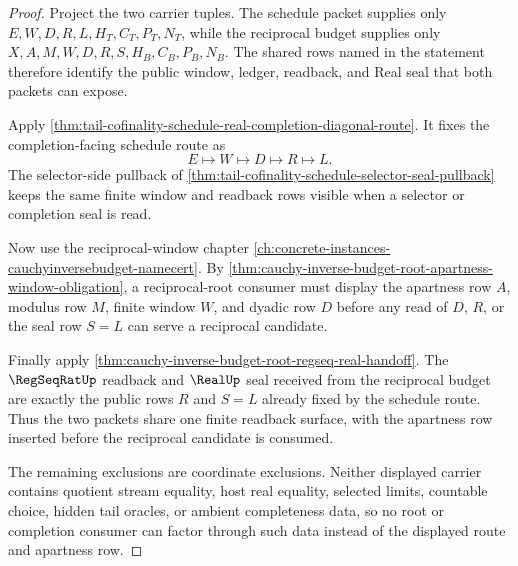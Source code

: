 \begin{proof}
Project the two carrier tuples. The schedule packet supplies only
$E,W,D,R,L,H_T,C_T,P_T,N_T$, while the reciprocal budget supplies only
$X,A,M,W,D,R,S,H_B,C_B,P_B,N_B$. The shared rows named in the statement
therefore identify the public window, ledger, readback, and Real seal that
both packets can expose.

Apply
\autoref{thm:tail-cofinality-schedule-real-completion-diagonal-route}. It
fixes the completion-facing schedule route as
$$
E \longmapsto W \longmapsto D \longmapsto R \longmapsto L.
$$
The selector-side pullback of
\autoref{thm:tail-cofinality-schedule-selector-seal-pullback} keeps the same
finite window and readback rows visible when a selector or completion seal is
read.

Now use the reciprocal-window chapter
\autoref{ch:concrete-instances-cauchyinversebudget-namecert}. By
\autoref{thm:cauchy-inverse-budget-root-apartness-window-obligation}, a
reciprocal-root consumer must display the apartness row $A$, modulus row $M$,
finite window $W$, and dyadic row $D$ before any read of $D$, $R$, or the
seal row $S=L$ can serve a reciprocal candidate.

Finally apply
\autoref{thm:cauchy-inverse-budget-root-regseq-real-handoff}. The
$\RegSeqRatUp$ readback and $\RealUp$ seal received from the reciprocal budget
are exactly the public rows $R$ and $S=L$ already fixed by the schedule route.
Thus the two packets share one finite readback surface, with the apartness row
inserted before the reciprocal candidate is consumed.

The remaining exclusions are coordinate exclusions. Neither displayed carrier
contains quotient stream equality, host real equality, selected limits,
countable choice, hidden tail oracles, or ambient completeness data, so no
root or completion consumer can factor through such data instead of the
displayed route and apartness row.
\end{proof}

